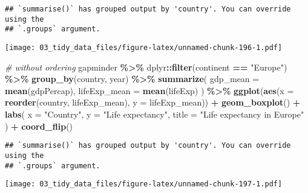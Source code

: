 \documentclass[
]{book}
\newenvironment{Shaded}{\begin{snugshade}}{\end{snugshade}}
\newcommand{\CommentTok}[1]{\textcolor[rgb]{0.56,0.35,0.01}{\textit{#1}}}
\newcommand{\DataTypeTok}[1]{\textcolor[rgb]{0.13,0.29,0.53}{#1}}
\newcommand{\KeywordTok}[1]{\textcolor[rgb]{0.13,0.29,0.53}{\textbf{#1}}}
\newcommand{\NormalTok}[1]{#1}
\newcommand{\OperatorTok}[1]{\textcolor[rgb]{0.81,0.36,0.00}{\textbf{#1}}}
\newcommand{\StringTok}[1]{\textcolor[rgb]{0.31,0.60,0.02}{#1}}
\begin{document}
\begin{verbatim}
## `summarise()` has grouped output by 'country'. You can override using the
## `.groups` argument.
\end{verbatim}

\texttt{[image: 03\_tidy\_data\_files/figure-latex/unnamed-chunk-196-1.pdf]}

\begin{Shaded}
\begin{Highlighting}[]
\CommentTok{\# without ordering}
\NormalTok{gapminder }\OperatorTok{\%\textgreater{}\%}
\StringTok{  }\NormalTok{dplyr}\OperatorTok{::}\KeywordTok{filter}\NormalTok{(continent }\OperatorTok{==}\StringTok{ "Europe"}\NormalTok{) }\OperatorTok{\%\textgreater{}\%}
\StringTok{  }\KeywordTok{group\_by}\NormalTok{(country, year) }\OperatorTok{\%\textgreater{}\%}
\StringTok{  }\KeywordTok{summarize}\NormalTok{(}
    \DataTypeTok{gdp\_mean =} \KeywordTok{mean}\NormalTok{(gdpPercap),}
    \DataTypeTok{lifeExp\_mean =} \KeywordTok{mean}\NormalTok{(lifeExp)}
\NormalTok{  ) }\OperatorTok{\%\textgreater{}\%}
\StringTok{  }\KeywordTok{ggplot}\NormalTok{(}\KeywordTok{aes}\NormalTok{(}\DataTypeTok{x =} \KeywordTok{reorder}\NormalTok{(country, lifeExp\_mean), }\DataTypeTok{y =}\NormalTok{ lifeExp\_mean)) }\OperatorTok{+}
\StringTok{  }\KeywordTok{geom\_boxplot}\NormalTok{() }\OperatorTok{+}
\StringTok{  }\KeywordTok{labs}\NormalTok{(}
    \DataTypeTok{x =} \StringTok{"Country"}\NormalTok{,}
    \DataTypeTok{y =} \StringTok{"Life expectancy"}\NormalTok{,}
    \DataTypeTok{title =} \StringTok{"Life expectancy in Europe"}
\NormalTok{  ) }\OperatorTok{+}
\StringTok{  }\KeywordTok{coord\_flip}\NormalTok{()}
\end{Highlighting}
\end{Shaded}

\begin{verbatim}
## `summarise()` has grouped output by 'country'. You can override using the
## `.groups` argument.
\end{verbatim}

\texttt{[image: 03\_tidy\_data\_files/figure-latex/unnamed-chunk-197-1.pdf]}
\end{document}
